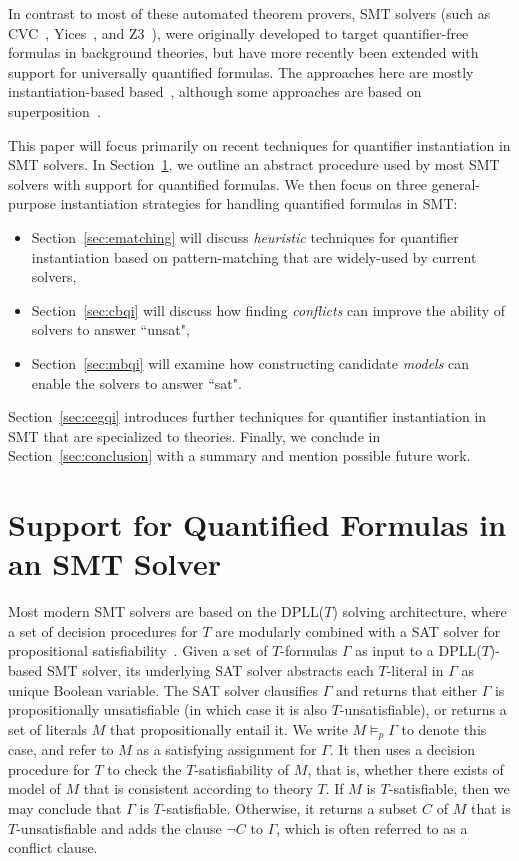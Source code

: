 \documentclass[oribibl]{llncs}
\begin{document}
In contrast to most of these automated theorem provers, 
SMT solvers (such as CVC~\cite{}, Yices~\cite{}, and Z3~\cite{}), 
were originally developed to target quantifier-free formulas in background theories,
but have more recently been extended with support for universally quantified formulas.
The approaches here are mostly instantiation-based based~\cite{},
although some approaches are based on superposition~\cite{}.

This paper will focus primarily on recent techniques for quantifier instantiation in SMT solvers.
In Section~\ref{sec:quant}, we outline an abstract procedure used by most SMT solvers with support for quantified formulas.
We then focus on three general-purpose instantiation strategies for handling quantified formulas in SMT:
\begin{itemize}
\item Section~\ref{sec:ematching} will discuss \emph{heuristic} techniques for quantifier instantiation based on pattern-matching that
are widely-used by current solvers,
\item Section~\ref{sec:cbqi} will discuss how finding \emph{conflicts} can improve the ability of solvers to answer ``unsat",
\item Section~\ref{sec:mbqi} will examine how constructing candidate \emph{models} can enable the solvers to answer ``sat".
\end{itemize} 
Section~\ref{sec:cegqi} introduces further techniques for quantifier instantiation in SMT that 
are specialized to theories.
Finally, we conclude in Section~\ref{sec:conclusion} with a summary and mention possible future work.

\section{Support for Quantified Formulas in an SMT Solver}
\label{sec:quant}

Most modern SMT solvers are based on the DPLL($T$) solving architecture,
where a set of decision procedures for $T$ are modularly combined with a SAT solver for propositional satisfiability~\cite{}.
Given a set of $T$-formulas $\Gamma$ as input to a DPLL($T$)-based SMT solver, its underlying SAT solver
abstracts each $T$-literal in $\Gamma$ as unique Boolean variable.
The SAT solver clausifies $\Gamma$ and returns that 
either $\Gamma$ is propositionally unsatisfiable (in which case it is also $T$-unsatisfiable),
or returns a set of literals $M$ that propositionally entail it.
We write $M \models_p \Gamma$ to denote this case, and refer to $M$ as a satisfying assignment for $\Gamma$.
It then uses a decision procedure for $T$ to
check the $T$-satisfiability of $M$, that is, whether there exists of model of $M$ that is consistent according to theory $T$.
If $M$ is $T$-satisfiable, then we may conclude that $\Gamma$ is $T$-satisfiable.
Otherwise, it returns a subset $C$ of $M$ that is $T$-unsatisfiable and adds the clause $\neg C$ to $\Gamma$,
which is often referred to as a conflict clause.
\end{document}
